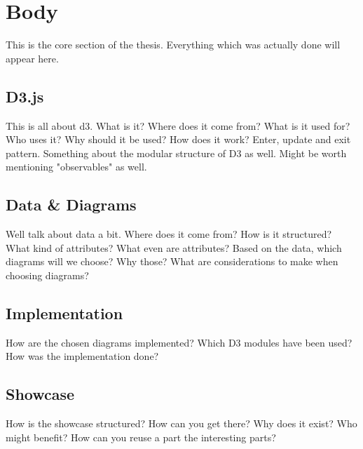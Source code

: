 \chapter{Body}
This is the core section of the thesis. Everything which was actually done will appear here.

\section{D3.js}
This is all about d3. What is it? Where does it come from? What is it used for? Who uses it? Why should it be used? How does it work? Enter, update and exit pattern. Something about the modular structure of D3 as well. Might be worth mentioning "observables" as well.

\section{Data \& Diagrams}
Well talk about data a bit. Where does it come from? How is it structured? What kind of attributes? What even are attributes? Based on the data, which diagrams will we choose? Why those? What are considerations to make when choosing diagrams?

\section{Implementation}
How are the chosen diagrams implemented? Which D3 modules have been used? How was the implementation done?

\section{Showcase}
How is the showcase structured? How can you get there? Why does it exist? Who might benefit? How can you reuse a part the interesting parts?